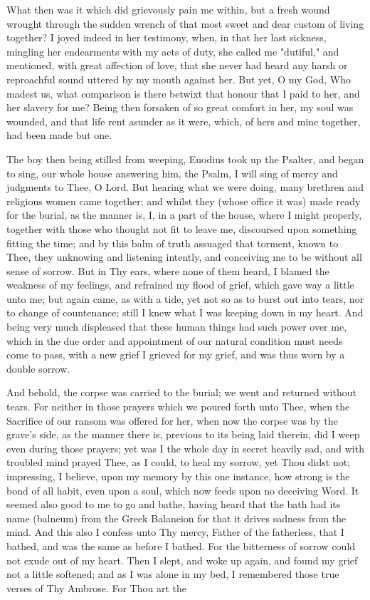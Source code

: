 \documentclass[b5paper,openright,12pt,twoside]{book}
\begin{document}
What then was it which did grievously pain me within, but a fresh wound
wrought through the sudden wrench of that most sweet and dear custom of
living together? I joyed indeed in her testimony, when, in that her last
sickness, mingling her endearments with my acts of duty, she called me
"dutiful," and mentioned, with great affection of love, that she never
had heard any harsh or reproachful sound uttered by my mouth against
her. But yet, O my God, Who madest us, what comparison is there betwixt
that honour that I paid to her, and her slavery for me? Being then
forsaken of so great comfort in her, my soul was wounded, and that life
rent asunder as it were, which, of hers and mine together, had been made
but one.

The boy then being stilled from weeping, Euodius took up the Psalter,
and began to sing, our whole house answering him, the Psalm, I will sing
of mercy and judgments to Thee, O Lord. But hearing what we were doing,
many brethren and religious women came together; and whilst they (whose
office it was) made ready for the burial, as the manner is, I, in a part
of the house, where I might properly, together with those who thought
not fit to leave me, discoursed upon something fitting the time; and by
this balm of truth assuaged that torment, known to Thee, they unknowing
and listening intently, and conceiving me to be without all sense of
sorrow. But in Thy ears, where none of them heard, I blamed the weakness
of my feelings, and refrained my flood of grief, which gave way a little
unto me; but again came, as with a tide, yet not so as to burst out into
tears, nor to change of countenance; still I knew what I was keeping
down in my heart. And being very much displeased that these human things
had such power over me, which in the due order and appointment of our
natural condition must needs come to pass, with a new grief I grieved
for my grief, and was thus worn by a double sorrow.

And behold, the corpse was carried to the burial; we went and returned
without tears. For neither in those prayers which we poured forth unto
Thee, when the Sacrifice of our ransom was offered for her, when now the
corpse was by the grave's side, as the manner there is, previous to its
being laid therein, did I weep even during those prayers; yet was I the
whole day in secret heavily sad, and with troubled mind prayed Thee, as
I could, to heal my sorrow, yet Thou didst not; impressing, I believe,
upon my memory by this one instance, how strong is the bond of all
habit, even upon a soul, which now feeds upon no deceiving Word. It
seemed also good to me to go and bathe, having heard that the bath had
its name (balneum) from the Greek Balaneion for that it drives sadness
from the mind. And this also I confess unto Thy mercy, Father of the
fatherless, that I bathed, and was the same as before I bathed. For the
bitterness of sorrow could not exude out of my heart. Then I slept, and
woke up again, and found my grief not a little softened; and as I was
alone in my bed, I remembered those true verses of Thy Ambrose. For Thou
art the
\end{document}
